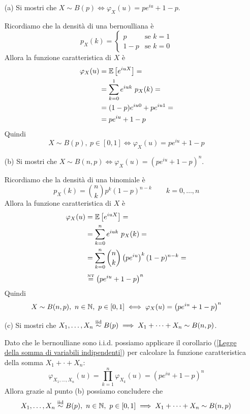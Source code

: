 \Soluzione{} %
\begin{enumerate}
\item [(a)] Si mostri che $X\sim B(p)\iff\varphi_X(u)=pe^{iu}+1-p$.

Ricordiamo che la densità di una bernoulliana è
\[
p_X(k)=\begin{cases} p&\text{se }k=1 \\ 1-p &\text{se }k=0 \end{cases}
\]
Allora la funzione caratteristica di $X$ è
\begin{gather*}
\begin{aligned}
\varphi_X(u)&=\mathbb{E}\left[e^{iuX}  \right]=\\
&=\sum_{k=0}^1e^{iuk}\ p_X(k)=\\
&=(1-p)e^{iu0}+pe^{iu1}=\\
&=pe^{iu}+1-p
\end{aligned}
\end{gather*}
Quindi
\[
X\sim B(p),\ p\in[0,1]\iff\varphi_X(u)=pe^{iu}+1-p
\]

\item [(b)] Si mostri che $X\sim B(n,p)\iff\varphi_X(u)=\left(pe^{iu}+1-p  \right)^n$.

Ricordiamo che la densità di una binomiale è
\[
p_X(k)=\binom{n}{k}p^k(1-p)^{n-k}\qquad k=0,\dots,n
\]
Allora la funzione caratteristica di $X$ è
\begin{gather*}
\begin{aligned}
\varphi_X(u)&=\mathbb{E}\left[e^{iuX}  \right]=\\
&=\sum_{k=0}^ne^{iuk}\ p_X(k)=\\
&=\sum_{k=0}^n\binom{n}{k}\left(pe^{iu}\right)^k(1-p)^{n-k}=\\
&\overset{\underset{\text{NT}}{}}{=}\left(pe^{iu}+1-p\right)^n
\end{aligned}
\end{gather*}
Quindi
\[
X\sim B(n,p),\ n\in\NN,\ p\in[0,1]\iff\varphi_X(u)=\left(pe^{iu}+1-p\right)^n
\]

\item [(c)] Si mostri che $X_1,\dots,X_n\stackrel{\mathrm{iid}}{\sim} B(p)\implies X_1+\cdots+X_n\sim B(n,p)$.

Dato che le bernoulliane sono i.i.d. possiamo applicare il corollario (\ref{Legge della somma di variabili indipendenti}) per calcolare la funzione caratteristica della somma $X_1+\cdot+X_n$:
\[
\varphi_{X_1,\dots,X_n}(u)=\prod_{k=1}^n\varphi_{X_k}(u)=\left(pe^{iu}+1-p\right)^n
\]
Allora grazie al punto (b) possiamo concludere che 
\[
X_1,\dots,X_n\stackrel{\mathrm{iid}}{\sim} B(p),\ n\in\mathbb{N},\ p\in[0,1] \implies X_1+\cdots+X_n\sim B(n,p)
\]


\end{enumerate}
